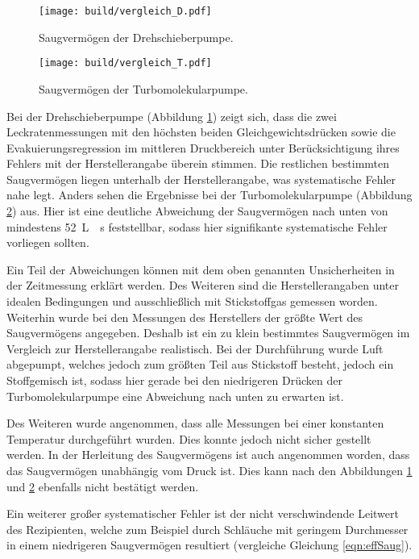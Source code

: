\begin{figure}
  \centering
  \texttt{[image: build/vergleich\_D.pdf]}
  \caption{Saugvermögen der Drehschieberpumpe.}
  \label{fig:vgl_D}
\end{figure}
\begin{figure}
  \centering
  \texttt{[image: build/vergleich\_T.pdf]}
  \caption{Saugvermögen der Turbomolekularpumpe.}
  \label{fig:vgl_T}
\end{figure}
\FloatBarrier

Bei der Drehschieberpumpe (Abbildung \ref{fig:vgl_D}) zeigt sich,
dass die zwei Leckratenmessungen mit den
höchsten beiden Gleichgewichtsdrücken sowie die Evakuierungsregression im
mittleren Druckbereich unter Berücksichtigung ihres Fehlers mit der Herstellerangabe
überein stimmen. Die restlichen bestimmten Saugvermögen liegen unterhalb der
Herstellerangabe, was systematische Fehler nahe legt.
Anders sehen die Ergebnisse bei der Turbomolekularpumpe
(Abbildung \ref{fig:vgl_T}) aus. Hier ist eine deutliche Abweichung der
Saugvermögen nach unten von mindestens \SI{52}{\liter{}\second}
feststellbar, sodass hier signifikante systematische Fehler vorliegen sollten.

Ein Teil der Abweichungen können mit dem oben genannten Unsicherheiten in
der Zeitmessung erklärt werden. Des Weiteren sind die Herstellerangaben
unter idealen Bedingungen und ausschließlich mit Stickstoffgas gemessen
worden. Weiterhin wurde bei den Messungen des Herstellers der größte
Wert des Saugvermögens angegeben. Deshalb ist ein zu klein bestimmtes
Saugvermögen im Vergleich zur Herstellerangabe realistisch. Bei der
Durchführung wurde Luft abgepumpt, welches jedoch zum größten Teil aus
Stickstoff besteht, jedoch ein Stoffgemisch ist, sodass hier gerade bei
den niedrigeren Drücken der Turbomolekularpumpe eine Abweichung nach unten
zu erwarten ist.

Des Weiteren wurde angenommen, dass alle Messungen bei einer konstanten
Temperatur durchgeführt wurden. Dies konnte jedoch nicht sicher gestellt werden.
In der Herleitung des Saugvermögens ist auch angenommen worden, dass das
Saugvermögen unabhängig vom Druck ist. Dies kann nach den Abbildungen
\ref{fig:vgl_D} und \ref{fig:vgl_T} ebenfalls nicht bestätigt werden.

Ein weiterer großer systematischer Fehler ist der nicht verschwindende Leitwert
des Rezipienten, welche zum Beispiel durch Schläuche mit geringem Durchmesser
in einem niedrigeren Saugvermögen resultiert (vergleiche Gleichung \eqref{eqn:effSaug}).

